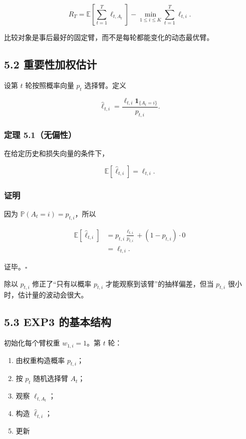 \documentclass[
  11pt,
  a4paper,
]{ctexart}
\providecommand{\tightlist}{%
  \setlength{\itemsep}{0pt}\setlength{\parskip}{0pt}}
\begin{document}
\[
R_T=
\mathbb E\left[\sum_{t=1}^T\ell_{t,A_t}\right]
-\min_{1\le i\le K}\sum_{t=1}^T\ell_{t,i}.
\]

比较对象是事后最好的固定臂，而不是每轮都能变化的动态最优臂。

\subsection{5.2
重要性加权估计}\label{ux91cdux8981ux6027ux52a0ux6743ux4f30ux8ba1}

设第 \(t\) 轮按照概率向量 \(p_t\) 选择臂。定义

\[
\widehat\ell_{t,i}
=\frac{\ell_{t,i}\mathbf1_{\{A_t=i\}}}{p_{t,i}}.
\]

\subsubsection{定理
5.1（无偏性）}\label{ux5b9aux7406-5.1ux65e0ux504fux6027}

在给定历史和损失向量的条件下，

\[
\mathbb E[\widehat\ell_{t,i}]=\ell_{t,i}.
\]

\subsubsection{证明}\label{ux8bc1ux660e-6}

因为 \(\mathbb P(A_t=i)=p_{t,i}\)，所以

\[
\begin{aligned}
\mathbb E[\widehat\ell_{t,i}]
&=p_{t,i}\frac{\ell_{t,i}}{p_{t,i}}
+(1-p_{t,i})\cdot0\\
&=\ell_{t,i}.
\end{aligned}
\]

证毕。\(\square\)

除以 \(p_{t,i}\) 修正了``只有以概率 \(p_{t,i}\)
才能观察到该臂''的抽样偏差，但当 \(p_{t,i}\)
很小时，估计量的波动会很大。

\subsection{5.3 EXP3
的基本结构}\label{exp3-ux7684ux57faux672cux7ed3ux6784}

初始化每个臂权重 \(w_{1,i}=1\)。第 \(t\) 轮：

\begin{enumerate}
\def\labelenumi{\arabic{enumi}.}
\tightlist
\item
  由权重构造概率 \(p_{t,i}\)；
\item
  按 \(p_t\) 随机选择臂 \(A_t\)；
\item
  观察 \(\ell_{t,A_t}\)；
\item
  构造 \(\widehat\ell_{t,i}\)；
\item
  更新
\end{enumerate}
\end{document}
